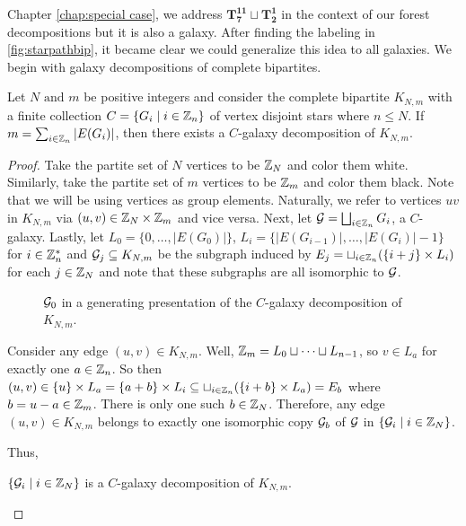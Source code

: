 Chapter \ref{chap:special case}, we address $\mathbf{T_{7}^{11}}\sqcup\mathbf{T_{2}^{1}}$ in the context of our forest decompositions but it is also a galaxy. After finding the labeling in \ref{fig:starpathbip}, it became clear we could generalize this idea to all galaxies. We begin with galaxy decompositions of complete bipartites.

\begin{thm}\label{thm:galdecomp}
Let $N\text{ and }m$ be positive integers and consider the complete bipartite $K_{N,m}$ with a finite collection $C=\{G_{i}\mid i\in \mathbb{Z}_{n}\}$ of vertex disjoint stars where $n\leq N$. If $m=\sum_{i\in \mathbb{Z}_{n}}|E(G_{i})|$, then there exists a $C$-galaxy decomposition of $K_{N,m}$.
\end{thm}
\begin{proof}
  Take the partite set of $N$ vertices to be $\mathbb{Z}_{N}$ and color them white. Similarly, take the partite set of $m$ vertices to be $\mathbb{Z}_{m}$ and color them black. Note that we will be using vertices as group elements. Naturally, we refer to  vertices $uv$ in $K_{N,m}$ via $(u,v)\in \mathbb{Z}_{N}\times \mathbb{Z}_{m}$ and vice versa. Next, let $\mathcal{G}=\bigsqcup_{i\in \mathbb{Z}_{n}}G_{i}$, a $C$-galaxy. Lastly, let $L_{0}=\{0,\hdots,|E(G_{0})|\}$, $L_{i}=\{|E(G_{i-1})|,\hdots,|E(G_{i})|-1\}$ for $i\in \mathbb{Z}^{*}_{n}$ and $\mathcal{G}_{j}\subseteq K_{N,m}$ be the subgraph induced by $E_{j}=\sqcup_{i\in \mathbb{Z}_{n}} (\{i+j\}\times L_{i})$ for each $j\in \mathbb{Z}_{N}$ and note that these subgraphs are all isomorphic to $\mathcal{G}$.
\begin{figure}[H]
    \centering
    
    \caption{$\mathcal{G}_{0}$ in a generating presentation of the $C$-galaxy decomposition of $K_{N,m}$.}
    \label{fig:galdecomp}
\end{figure}
\noindent Consider any edge $(u,v)\in K_{N,m}$. Well, $\mathbb{Z}_{m}=L_{0}\sqcup \cdots \sqcup L_{n-1}$, so $v\in L_{a}$ for exactly one $a\in \mathbb{Z}_{n}$. So then $(u,v)\in \{u\}\times L_{a}=\{a+b\}\times L_{i}\subseteq \sqcup_{i\in \mathbb{Z}_{n}} (\{i+b\}\times L_{a})=E_{b}$ where $b=u-a\in \mathbb{Z}_{m}$. There is only one such $b\in \mathbb{Z}_{N}$. Therefore, any edge $(u,v)\in K_{N,m}$ belongs to exactly one isomorphic copy $\mathcal{G}_{b}$ of $\mathcal{G}$ in $\{\mathcal{G}_{i}\mid i\in \mathbb{Z}_{N}\}$.\newline

Thus,
\begin{center}
$\{\mathcal{G}_{i}\mid i\in \mathbb{Z}_{N}\}$ is a $C$-galaxy decomposition of $K_{N,m}$.
\end{center}
  
\end{proof}
